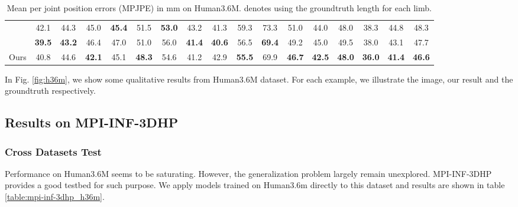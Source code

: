 \documentclass{bmvc2k}
\begin{document}
\begin{table*}[h]
\begin{center}
\begin{tabular}{|l|c|c|c|c|c|c|c|c|c|c|c|c|c|c|c|c|}
            \cite{sun2017compositional} & 42.1 & 44.3 & 45.0 & \textbf{45.4} & 51.5 & \textbf{53.0} & 43.2 & 41.3 & 59.3 & 73.3 & 51.0 & 44.0 & 48.0 & 38.3 & 44.8 & 48.3 \\
            \cite{martinez2017simple} & \textbf{39.5} & \textbf{43.2}&  46.4&  47.0&  51.0 & 56.0&  \textbf{41.4} &  \textbf{40.6} &  56.5  &  \textbf{69.4} & 49.2  &45.0  &49.5  &38.0  &43.1 & 47.7 \\
			Ours & 40.8 & 44.6 & \textbf{42.1} & 45.1 & \textbf{48.3} & 54.6 & 41.2 & 42.9 & \textbf{55.5} &69.9 & \textbf{46.7} & \textbf{42.5} & \textbf{48.0} & \textbf{36.0} & \textbf{41.4} & \textbf{46.6} \\ \hline
			
		\end{tabular}
	\end{center}
	\caption{Mean per joint position errors (MPJPE) in mm on Human3.6M.  denotes using the groundtruth length for each limb.} \label{table:protocol1}
\end{table*}
In Fig. \ref{fig:h36m}, we show some qualitative results from Human3.6M dataset. For each example, we illustrate the image, our result and the groundtruth respectively. 

\subsection{Results on MPI-INF-3DHP}
\subsubsection{Cross Datasets Test}
Performance on Human3.6M seems to be saturating. However, the generalization problem largely remain unexplored. MPI-INF-3DHP provides a good testbed for such purpose. We apply models trained on Human3.6m directly to this dataset and results are shown in table \ref{table:mpi-inf-3dhp_h36m}. 
\end{document}
